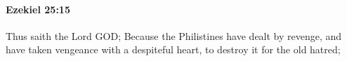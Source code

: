
		\paragraph{Ezekiel 25:15} %
			\label{EZEKIEL-25-15}

			Thus saith the Lord GOD; Because the Philistines have dealt by revenge, and have taken vengeance with a despiteful heart, to destroy it for the old hatred;


